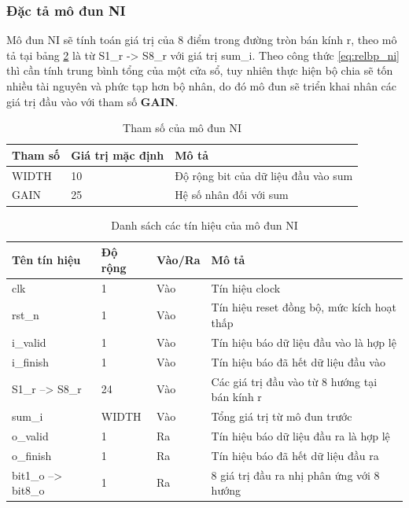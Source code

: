 \subsubsection{Đặc tả mô đun NI}
Mô đun NI sẽ tính toán giá trị của 8 điểm trong đường tròn bán kính r, theo mô tả tại bảng \ref{tab:signalListNI} là từ S1\_r -> S8\_r với giá trị sum\_i. Theo công thức \ref{eq:relbp_ni} thì cần tính trung bình tổng của một cửa sổ, tuy nhiên thực hiện bộ chia sẽ tốn nhiều tài nguyên và phức tạp hơn bộ nhân, do đó mô đun sẽ triển khai nhân các giá trị đầu vào với tham số \textbf{GAIN}.
\begin{table}[!ht]
    \centering
    \renewcommand{\arraystretch}{1.3} %
    \begin{tabular}{|p{3cm} p{4cm} p{8cm}|}
        \hline
        \rowcolor{gray!30}
        \textbf{Tham số } & \textbf{Giá trị mặc định}  & \textbf{Mô tả} \\
        \hline
        WIDTH & 10 & Độ rộng bit của dữ liệu đầu vào sum
        \\ \hline
        GAIN & 25 & Hệ số nhân đối với sum
        \\
        \hline
    \end{tabular}
    \caption{Tham số của mô đun NI}
    \label{tab:paramListNI}
\end{table}
\begin{table}[!ht]
    \centering
    \renewcommand{\arraystretch}{1.3} %
    \begin{tabular}{|p{3cm} p{2cm} p{2cm} p{8cm}|}
        \hline
        \rowcolor{gray!30}
        \textbf{Tên tín hiệu} & \textbf{Độ rộng} & \textbf{Vào/Ra} & \textbf{Mô tả} \\
        \hline
        clk & 1 & Vào & Tín hiệu clock \\
        \hline
        rst\_n & 1 & Vào & Tín hiệu reset đồng bộ, mức kích hoạt thấp \\
        \hline
        i\_valid & 1 & Vào & Tín hiệu báo dữ liệu đầu vào là hợp lệ \\
        \hline
        i\_finish & 1 & Vào & Tín hiệu báo đã hết dữ liệu đầu vào \\
        \hline
        S1\_r --> S8\_r & 24 & Vào & Các giá trị đầu vào từ 8 hướng tại bán kính r\\
        \hline
        sum\_i & WIDTH & Vào & Tổng giá trị từ mô đun trước \\
        \hline
        o\_valid & 1 & Ra & Tín hiệu báo dữ liệu đầu ra là hợp lệ\\
        \hline
        o\_finish & 1 & Ra & Tín hiệu báo đã hết dữ liệu đầu ra \\
        \hline
        bit1\_o --> bit8\_o & 1 & Ra & 8 giá trị đầu ra nhị phân ứng với 8 hướng \\
        \hline
    \end{tabular}
    \caption{Danh sách các tín hiệu của mô đun NI}
    \label{tab:signalListNI}
\end{table}

